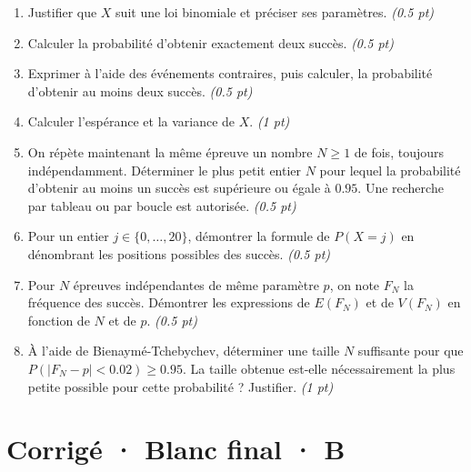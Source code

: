 \begin{enumerate}

\item Justifier que $X$ suit une loi binomiale et préciser ses paramètres. \hfill\textit{(\num{0,5} pt)}

\item Calculer la probabilité d'obtenir exactement deux succès. \hfill\textit{(\num{0,5} pt)}

\item Exprimer à l'aide des événements contraires, puis calculer, la probabilité d'obtenir au moins deux succès. \hfill\textit{(\num{0,5} pt)}

\item Calculer l'espérance et la variance de $X$. \hfill\textit{(1 pt)}

\item On répète maintenant la même épreuve un nombre $N\ge1$ de fois, toujours indépendamment. Déterminer le plus petit entier $N$ pour lequel la probabilité d'obtenir au moins un succès est supérieure ou égale à $\num{0,95}$. Une recherche par tableau ou par boucle est autorisée. \hfill\textit{(\num{0,5} pt)}

\item Pour un entier $j\in\{0,\ldots,20\}$, démontrer la formule de $P(X=j)$ en dénombrant les positions possibles des succès. \hfill\textit{(\num{0,5} pt)}

\item Pour $N$ épreuves indépendantes de même paramètre $p$, on note $F_N$ la fréquence des succès. Démontrer les expressions de $E(F_N)$ et de $V(F_N)$ en fonction de $N$ et de $p$. \hfill\textit{(\num{0,5} pt)}

\item À l'aide de Bienaymé-Tchebychev, déterminer une taille $N$ suffisante pour que $P(|F_N-p|<\num{0,02})\ge\num{0,95}$. La taille obtenue est-elle nécessairement la plus petite possible pour cette probabilité ? Justifier. \hfill\textit{(1 pt)}

\end{enumerate}

\ifmxteacher\mxnewpage

\section*{Corrigé · Blanc final · B}\label{cor:9-4}

